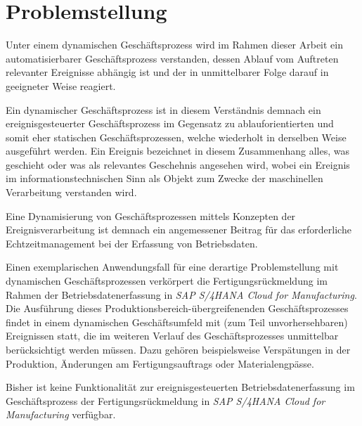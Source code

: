 \section{Problemstellung}

Unter einem dynamischen Geschäftsprozess wird im Rahmen dieser Arbeit ein automatisierbarer Geschäftsprozess verstanden, dessen Ablauf vom Auftreten relevanter Ereignisse abhängig ist und der in unmittelbarer Folge darauf in geeigneter Weise reagiert. 

Ein dynamischer Geschäftsprozess ist in diesem Verständnis demnach ein ereignisgesteuerter Geschäftsprozess im Gegensatz zu ablauforientierten und somit eher statischen Geschäftsprozessen, welche wiederholt in derselben Weise ausgeführt werden. Ein Ereignis bezeichnet in diesem Zusammenhang alles, was geschieht oder was als relevantes Geschehnis angesehen wird, wobei ein Ereignis im informationstechnischen Sinn als Objekt zum Zwecke der maschinellen Verarbeitung verstanden wird.

Eine Dynamisierung von Geschäftsprozessen mittels Konzepten der Ereignisverarbeitung ist demnach ein angemessener Beitrag für das erforderliche Echtzeitmanagement bei der Erfassung von Betriebsdaten.

Einen exemplarischen Anwendungsfall für eine derartige Problemstellung mit dynamischen Geschäftsprozessen verkörpert die Fertigungsrückmeldung im Rahmen der Betriebsdatenerfassung in \textit{SAP S/4HANA Cloud for Manufacturing}. Die Ausführung dieses Produktionsbereich-übergreifenenden Geschäftsprozesses findet in einem dynamischen Geschäftsumfeld mit (zum Teil unvorhersehbaren) Ereignissen statt, die im weiteren Verlauf des Geschäftsprozesses unmittelbar berücksichtigt werden müssen. Dazu gehören beispielsweise Verspätungen in der Produktion, Änderungen am Fertigungsauftrags oder Materialengpässe.  

Bisher ist keine Funktionalität zur
ereignisgesteuerten Betriebsdatenerfassung im  Geschäftsprozess der Fertigungsrückmeldung in \textit{SAP S/4HANA Cloud for Manufacturing} verfügbar.